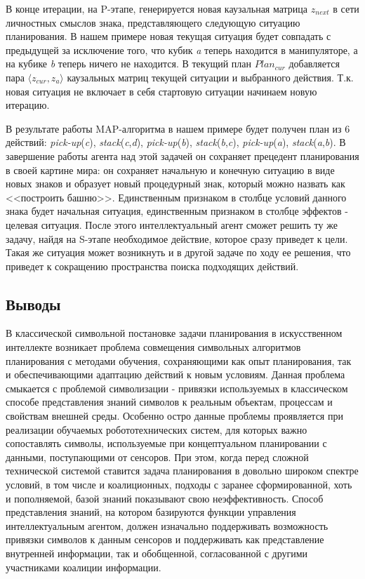 \documentclass[12pt]{report}
\begin{document}
	В конце итерации, на P-этапе, генерируется новая каузальная матрица $z_{next}$ в сети личностных смыслов знака, представляющего следующую ситуацию планирования. В нашем примере новая текущая ситуация будет совпадать с предыдущей за исключение того, что кубик \textit{a} теперь находится в манипуляторе, а на кубике \textit{b} теперь ничего не находится. В текущий план $Plan_{cur}$ добавляется пара $\langle z_{cur}, z_a \rangle$ каузальных матриц текущей ситуации и выбранного действия. Т.к. новая ситуация не включает в себя стартовую ситуации начинаем новую итерацию.
	
	В результате работы MAP-алгоритма в нашем примере будет получен план из 6 действий: \textit{pick-up}(\textit{c}), \textit{stack}(\textit{c},\textit{d}), \textit{pick-up}(\textit{b}), \textit{stack}(\textit{b},\textit{c}), \textit{pick-up}(\textit{a}), \textit{stack}(\textit{a},\textit{b}). В завершение работы агента над этой задачей он сохраняет прецедент планирования в своей картине мира: он сохраняет начальную и конечную ситуацию в виде новых знаков и образует новый процедурный знак, который можно назвать как <<построить башню>>. Единственным признаком в столбце условий данного знака будет начальная ситуация, единственным признаком в столбце эффектов - целевая ситуация. После этого интеллектуальный агент сможет решить ту же задачу, найдя на S-этапе необходимое действие, которое сразу приведет к цели. Такая же ситуация может возникнуть и в другой задаче по ходу ее решения, что приведет к сокращению пространства поиска подходящих действий.
		
	\subsection{Выводы}
	
	В классической символьной постановке задачи планирования в искусственном интеллекте возникает проблема совмещения символьных алгоритмов планирования с методами обучения, сохраняющими как опыт планирования, так и обеспечивающими адаптацию действий к новым условиям. Данная проблема смыкается с проблемой символизации - привязки используемых в классическом способе представления знаний символов к реальным объектам, процессам и свойствам внешней среды. Особенно остро данные проблемы проявляется при реализации обучаемых робототехнических систем, для которых важно сопоставлять символы, используемые при концептуальном планировании с данными, поступающими от сенсоров. При этом, когда перед сложной технической системой ставится задача планирования в довольно широком спектре условий, в том числе и коалиционных, подходы с заранее сформированной, хоть и пополняемой, базой знаний показывают свою неэффективность. Способ представления знаний, на котором базируются функции управления интеллектуальным агентом, должен изначально поддерживать возможность привязки символов к данным сенсоров и поддерживать как представление внутренней информации, так и обобщенной, согласованной с другими участниками коалиции информации. 
	
\end{document}
